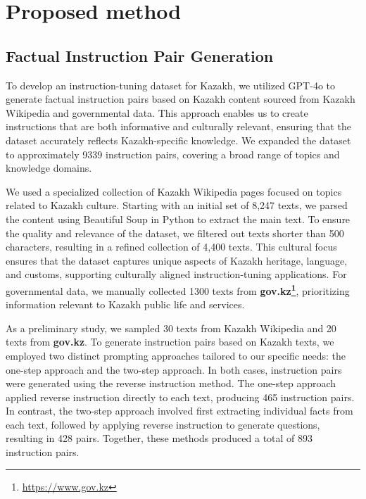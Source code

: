 \section{Proposed method}

\subsection{Factual Instruction Pair Generation}
To develop an instruction-tuning dataset for Kazakh, we utilized GPT-4o to generate factual instruction pairs based on Kazakh content sourced from Kazakh Wikipedia and governmental data. This approach enables us to create instructions that are both informative and culturally relevant, ensuring that the dataset accurately reflects Kazakh-specific knowledge. We expanded the dataset to approximately 9339 instruction pairs, covering a broad range of topics and knowledge domains.

We used a specialized collection of Kazakh Wikipedia pages focused on topics related to Kazakh culture. Starting with an initial set of 8,247 texts, we parsed the content using Beautiful Soup in Python to extract the main text. To ensure the quality and relevance of the dataset, we filtered out texts shorter than 500 characters, resulting in a refined collection of 4,400 texts. This cultural focus ensures that the dataset captures unique aspects of Kazakh heritage, language, and customs, supporting culturally aligned instruction-tuning applications. For governmental data, we manually collected 1300 texts from \textbf{gov.kz\footnote{\url{https://www.gov.kz}}}, prioritizing information relevant to Kazakh public life and services.

As a preliminary study, we sampled 30 texts from Kazakh Wikipedia and 20 texts from \textbf{gov.kz}. To generate instruction pairs based on Kazakh texts, we employed two distinct prompting approaches tailored to our specific needs: the one-step approach and the two-step approach. In both cases, instruction pairs were generated using the reverse instruction method. The one-step approach applied reverse instruction directly to each text, producing 465 instruction pairs. In contrast, the two-step approach involved first extracting individual facts from each text, followed by applying reverse instruction to generate questions, resulting in 428 pairs. Together, these methods produced a total of 893 instruction pairs.

